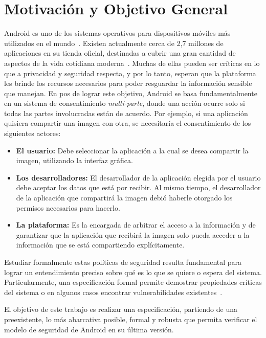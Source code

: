 \section{Motivación y Objetivo General}

Android es uno de los sistemas operativos para dispositivos móviles más
utilizados en el mundo~\cite{1,2}. Existen actualmente cerca de 2,7 millones de
aplicaciones en su tienda oficial, destinadas a cubrir una gran cantidad de
aspectos de la vida cotidiana moderna~\cite{3}. Muchas de ellas pueden ser críticas
en lo que a privacidad y seguridad respecta, y por lo tanto, esperan que la plataforma
les brinde los recursos necesarios para poder resguardar la información sensible
que manejan.
En pos de lograr este objetivo, Android se basa fundamentalmente en un
sistema de consentimiento \textit{multi-parte}, donde una acción ocurre solo si
todas las partes involucradas están de acuerdo. Por ejemplo, si una aplicación
quisiera compartir una imagen con otra, se necesitaría el consentimiento de los
siguientes actores:

\begin{itemize}
    \item \textbf{El usuario: } Debe seleccionar la aplicación a la cual se desea
          compartir la imagen, utilizando la interfaz gráfica.
    \item \textbf{Los desarrolladores: } El desarrollador de la aplicación
          elegida por el usuario debe aceptar los datos que está por recibir. Al mismo
          tiempo, el desarrollador de la aplicación que compartirá la imagen debió
          haberle otorgado los permisos necesarios para hacerlo.
    \item \textbf{La plataforma: } Es la encargada de arbitrar el acceso a la
          información y de garantizar que la aplicación que recibirá la imagen solo pueda
          acceder a la información que se está compartiendo explícitamente.
\end{itemize}


Estudiar formalmente estas políticas de seguridad resulta fundamental para
lograr un entendimiento preciso sobre qué es lo que se quiere o espera del
sistema. Particularmente, una especificación formal permite demostrar
propiedades críticas del sistema o en algunos casos encontrar vulnerabilidades
existentes~\cite{alloy}.

El objetivo de este trabajo es realizar una especificación, partiendo de una
preexistente, lo más abarcativa posible, formal y robusta que permita verificar
el modelo de seguridad de Android en su última versión.
